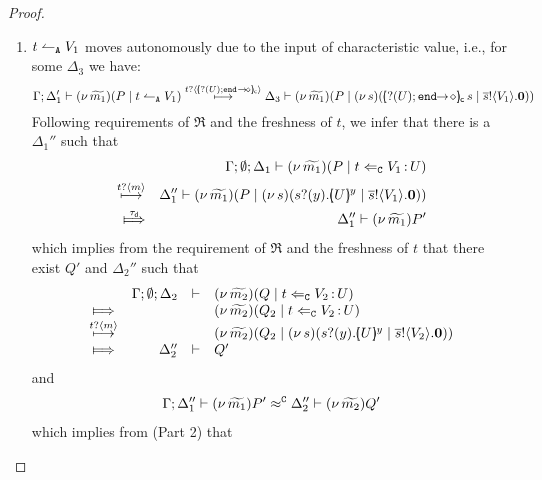 \begin{proof}
\begin{enumerate}[1.]
\begin{enumerate}
					\item	%
						$t \leftharpoonup_\mathtt{A} V_1$ moves autonomously due to the input of characteristic value, i.e., for some $\Delta_3$ we have:
						\[
							\horel{\Gamma}{\Delta_1'}{\newsp{\widetilde{m_1}}{P \Par \ntrigger{t}{V_1}}}
							{\hby{\bactinp{t}{\omapchar{\shot{\btinp{U} \tinact~}}}}}
							{\Delta_3}{\newsp{\widetilde{m_1}}{P \Par \newsp{s}{ \appl{\omapchar{\shot{\btinp{U} \tinact}}}{s} \Par \bout{\dual{s}}{V_1} \inact}}}
						\]
							Following requirements of $\Re$ and the freshness of $t$,
							we infer that there is a $\Delta_1''$ such that
						\begin{eqnarray*}
							&& \Gamma; \es; \Delta_1 \proves \newsp{\widetilde{m_1}}{P \Par \ftrigger{t}{V_1}{U}}\\
							\hby{\bactinp{t}{m}} &&
							\Delta_1'' \proves \newsp{\widetilde{m_1}}{P \Par \newsp{s}{\binp{s}{y} \mapchar{U}{y} \Par \bout{\dual{s}}{V_1} \inact}}\\
							\Hby{\dtau} &&
							\Delta_1'' \proves \news{\widetilde{m_1}}P'
						\end{eqnarray*}
							which implies from the  requirement of $\Re$ and
							the freshness of $t$ that there exist $Q'$ and $\Delta_2''$ such that
							\begin{eqnarray}
								\begin{array}{crll}
									& \Gamma; \es; \Delta_2 & \proves &		
									\newsp{\widetilde{m_2}}{Q \Par \ftrigger{t}{V_2}{U}}
									\\
									\Hby{} &&&
									\newsp{\widetilde{m_2}}{Q_2 \Par \ftrigger{t}{V_2}{U}}
									\\
									{\hby{\bactinp{t}{m}}}& & &
									\newsp{\widetilde{m_2}}{Q_2 \Par \newsp{s}{\binp{s}{y} \mapchar{U}{y} \Par \bout{\dual{s}}{V_2} \inact}}
									\\
									\Hby{} & \Delta_2'' & \proves & Q'
								\end{array}
								\label{proof:trig_equiv2}
							\end{eqnarray}
							and
							\begin{eqnarray*}
								\Gamma; \Delta_1'' \vdash (\nu\, \widetilde{m_1})P' \approx^\mathtt{C} \Delta_2'' \vdash (\nu\, \widetilde{m_2})Q'
							\end{eqnarray*}
							which implies from  (Part 2) that

\end{enumerate}
\end{enumerate}
\end{proof}
